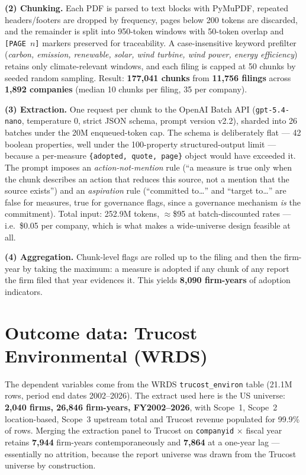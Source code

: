 \documentclass[11pt]{article}
\newcommand{\code}[1]{\texttt{\small #1}}
\begin{document}
\textbf{(2) Chunking.} Each PDF is parsed to text blocks with PyMuPDF,
repeated headers/footers are dropped by frequency, pages below 200 tokens are
discarded, and the remainder is split into 950-token windows with 50-token
overlap and \code{[PAGE~$n$]} markers preserved for traceability. A
case-insensitive keyword prefilter (\emph{carbon, emission, renewable, solar,
wind turbine, wind power, energy efficiency}) retains only climate-relevant
windows, and each filing is capped at 50 chunks by seeded random sampling.
Result: \textbf{177{,}041 chunks} from \textbf{11{,}756 filings} across
\textbf{1{,}892 companies} (median 10 chunks per filing, 35 per company).

\textbf{(3) Extraction.} One request per chunk to the OpenAI Batch API
(\code{gpt-5.4-nano}, temperature 0, strict JSON schema, prompt version
v2.2), sharded into 26 batches under the 20M enqueued-token cap. The schema is
deliberately flat --- 42 boolean properties, well under the 100-property
structured-output limit --- because a per-measure
\code{\{adopted, quote, page\}} object would have exceeded it. The prompt
imposes an \emph{action-not-mention} rule (``a measure is true only when the
chunk describes an action that reduces this source, not a mention that the
source exists'') and an \emph{aspiration} rule (``committed to\ldots'' and
``target to\ldots'' are false for measures, true for governance flags, since a
governance mechanism \emph{is} the commitment). Total input: 252.9M tokens,
$\approx$\$95 at batch-discounted rates --- i.e.\ \$0.05 per company, which is
what makes a wide-universe design feasible at all.

\textbf{(4) Aggregation.} Chunk-level flags are rolled up to the filing and
then the firm-year by taking the maximum: a measure is adopted if any chunk of
any report the firm filed that year evidences it. This yields
\textbf{8{,}090 firm-years} of adoption indicators.

\section{Outcome data: Trucost Environmental (WRDS)}

The dependent variables come from the WRDS \code{trucost\_environ} table
(21.1M rows, period end dates 2002--2026). The extract used here is the US
universe: \textbf{2{,}040 firms, 26{,}846 firm-years, FY2002--2026}, with
Scope~1, Scope~2 location-based, Scope~3 upstream total and Trucost revenue
populated for 99.9\% of rows. Merging the extraction panel to Trucost on
\code{companyid} $\times$ fiscal year retains \textbf{7{,}944} firm-years
contemporaneously and \textbf{7{,}864} at a one-year lag --- essentially no
attrition, because the report universe was drawn from the Trucost universe by
construction.
\end{document}

